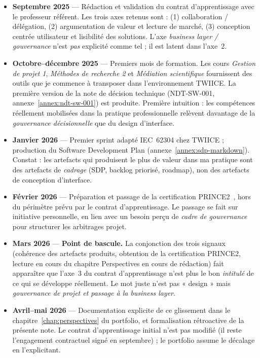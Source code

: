 \begin{itemize}
  \item \textbf{Septembre 2025} --- Rédaction et validation du contrat d'apprentissage avec le professeur référent. Les trois axes retenus sont : (1) collaboration / délégation, (2) argumentation de valeur et lecture de marché, (3) conception centrée utilisateur et lisibilité des solutions. L'axe \emph{business layer / gouvernance} n'est \emph{pas} explicité comme tel ; il est latent dans l'axe~2.
  \item \textbf{Octobre--décembre 2025} --- Premiers mois de formation. Les cours \emph{Gestion de projet 1}, \emph{Méthodes de recherche 2} et \emph{Médiation scientifique} fournissent des outils que je commence à transposer dans l'environnement TWIICE. La première version de la note de décision technique (NDT-SW-001, annexe~\ref{annex:ndt-sw-001}) est produite. Première intuition : les compétences réellement mobilisées dans la pratique professionnelle relèvent davantage de la \emph{gouvernance décisionnelle} que du design d'interface.
  \item \textbf{Janvier 2026} --- Premier sprint adapté IEC~62304 chez TWIICE ; production du Software Development Plan (annexe~\ref{annex:sdp-markdown}). Constat : les artefacts qui produisent le plus de valeur dans ma pratique sont des artefacts de \emph{cadrage} (SDP, backlog priorisé, roadmap), non des artefacts de conception d'interface.
  \item \textbf{Février 2026} --- Préparation et passage de la certification PRINCE2~\citep{prince2_2017}, hors du périmètre prévu par le contrat d'apprentissage. Le passage se fait sur initiative personnelle, en lien avec un besoin perçu de \emph{cadre de gouvernance} pour structurer les arbitrages projet.
  \item \textbf{Mars 2026} --- \textbf{Point de bascule.} La conjonction des trois signaux (cohérence des artefacts produits, obtention de la certification PRINCE2, lecture en cours du chapitre Perspectives en cours de rédaction) fait apparaître que l'axe~3 du contrat d'apprentissage n'est plus le bon \emph{intitulé} de ce qui se développe réellement. Le mot juste n'est pas « design » mais \emph{gouvernance de projet et passage à la business layer}.
  \item \textbf{Avril--mai 2026} --- Documentation explicite de ce glissement dans le chapitre~\ref{chap:perspectives} du portfolio, et formalisation rétroactive de la présente note. Le contrat d'apprentissage initial n'est pas modifié (il reste l'engagement contractuel signé en septembre) ; le portfolio assume le décalage en l'explicitant.
\end{itemize}


